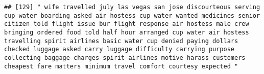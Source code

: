 \documentclass[
]{article}
\begin{document}
\begin{verbatim}
## [129] " wife travelled july las vegas san jose discourteous serving cup water boarding asked air hostess cup water wanted medicines senior citizen told flight issue bur flight response air hostess male crew bringing ordered food told half hour arranged cup water air hostess travelling spirit airlines basic water cup denied paying dollars checked luggage asked carry luggage difficulty carrying purpose collecting baggage charges spirit airlines motive harass customers cheapest fare matters minimum travel comfort courtesy expected "                                                                                                                                                                                                                                                                                                                                                                                                                                                                                                                                                                                                                                                                                                                                                                                                                                                                                                                                                                                                                                                                                                                                                                                                                                               

\end{verbatim}
\end{document}

